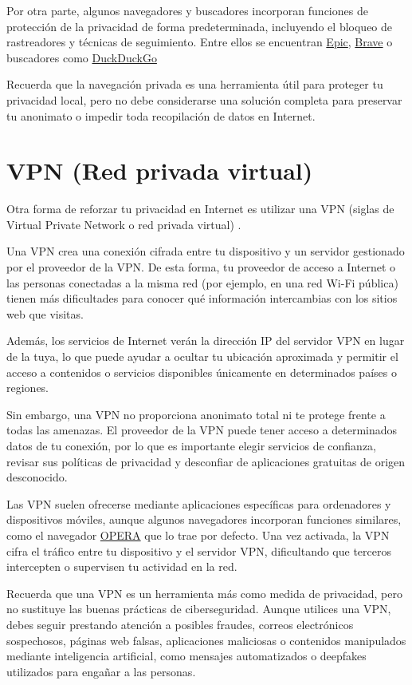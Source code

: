 \documentclass[
  spanish,
  a4paper,
  openany]{book}
\begin{document}
Por otra parte, algunos navegadores y buscadores incorporan funciones de protección de la privacidad de forma predeterminada, incluyendo el bloqueo de rastreadores y técnicas de seguimiento. Entre ellos se encuentran \href{https://www.epicbrowser.com/}{Epic}, \href{https://brave.com/es/}{Brave} o buscadores como \href{https://duckduckgo.com/}{DuckDuckGo}

Recuerda que la navegación privada es una herramienta útil para proteger tu privacidad local, pero no debe considerarse una solución completa para preservar tu anonimato o impedir toda recopilación de datos en Internet.

\section{VPN (Red privada virtual)}\label{vpn-red-privada-virtual}

Otra forma de reforzar tu privacidad en Internet es utilizar una VPN (siglas de Virtual Private Network o red privada virtual) \citep{XATAKA-vpn}.

Una VPN crea una conexión cifrada entre tu dispositivo y un servidor gestionado por el proveedor de la VPN. De esta forma, tu proveedor de acceso a Internet o las personas conectadas a la misma red (por ejemplo, en una red Wi-Fi pública) tienen más dificultades para conocer qué información intercambias con los sitios web que visitas.

Además, los servicios de Internet verán la dirección IP del servidor VPN en lugar de la tuya, lo que puede ayudar a ocultar tu ubicación aproximada y permitir el acceso a contenidos o servicios disponibles únicamente en determinados países o regiones.

Sin embargo, una VPN no proporciona anonimato total ni te protege frente a todas las amenazas. El proveedor de la VPN puede tener acceso a determinados datos de tu conexión, por lo que es importante elegir servicios de confianza, revisar sus políticas de privacidad y desconfiar de aplicaciones gratuitas de origen desconocido.

Las VPN suelen ofrecerse mediante aplicaciones específicas para ordenadores y dispositivos móviles, aunque algunos navegadores incorporan funciones similares, como el navegador \href{https://www.opera.com/es}{OPERA} que lo trae por defecto. Una vez activada, la VPN cifra el tráfico entre tu dispositivo y el servidor VPN, dificultando que terceros intercepten o supervisen tu actividad en la red.

Recuerda que una VPN es un herramienta más como medida de privacidad, pero no sustituye las buenas prácticas de ciberseguridad. Aunque utilices una VPN, debes seguir prestando atención a posibles fraudes, correos electrónicos sospechosos, páginas web falsas, aplicaciones maliciosas o contenidos manipulados mediante inteligencia artificial, como mensajes automatizados o deepfakes utilizados para engañar a las personas.
\end{document}
